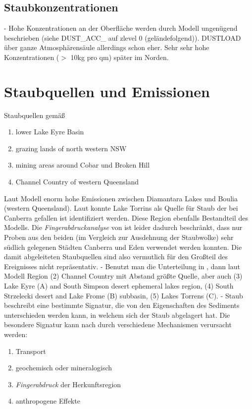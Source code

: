 \documentclass[12pt,a4paper,onecolumn,draft]{scrartcl}
\begin{document}
\subsection{Staubkonzentrationen}
- Hohe Konzentrationen an der Oberfläche werden durch Modell ungenügend beschrieben (siehe DUST_ACC_ auf zlevel 0 (geländefolgend)). DUSTLOAD über ganze Atmosphärensäule allerdings schon eher. Sehr sehr hohe Konzentrationen  ($>$ 10kg pro qm) später im Norden.
\section{Staubquellen und Emissionen}
Staubquellen gemäß \citep{Leys.2011}
\begin{enumerate}
\item lower Lake Eyre Basin
\item grazing lands of north western NSW
\item mining areas around Cobar und Broken Hill
\item Channel Country of western Queensland
\end{enumerate}
Laut Modell enorm hohe Emissionen zwischen Diamantara Lakes und Boulia (western Queensland). Laut \citet{Deckker.2014} konnte Lake Torrins als Quelle für Staub der bei Canberra gefallen ist identifiziert werden. Diese Region ebenfalls Bestandteil des Modells. Die \textit{Fingerabdruckanalyse} von \citet{Deckker.2014} ist leider dadurch beschränkt, dass nur Proben aus den beiden (im Vergleich zur Ausdehnung der Staubwolke) sehr südlich gelegenen Städten Canberra und Eden verwendet werden konnten. Die damit abgeleiteten Staubquellen sind also vermutlich für den Großteil des Ereignisses nicht repräsentativ. -  Benutzt man die Unterteilung in \citet{OLoingsigh.2017}, dann laut Modell Region (2) Channel Country mit Abstand größte Quelle, aber auch (3) Lake Eyre (A) and South Simpson desert ephemeral lakes region, (4) South Strzelecki desert and Lake Frome (B) subbasin, (5) Lakes Torrens (C). -  Staub beschreibt eine bestimmte Signatur, die von den Eigenschaften des Sediments unterschieden werden kann, in welchem sich der Staub abgelagert hat. Die besondere Signatur kann nach \citet{Marx.2018} durch verschiedene Mechanismen verursacht werden:
\begin{enumerate}
\item Transport
\item geochemisch oder mineralogisch
\item \textit{Fingerabdruck} der Herkunftsregion
\item anthropogene Effekte
\end{enumerate}
\end{document}
